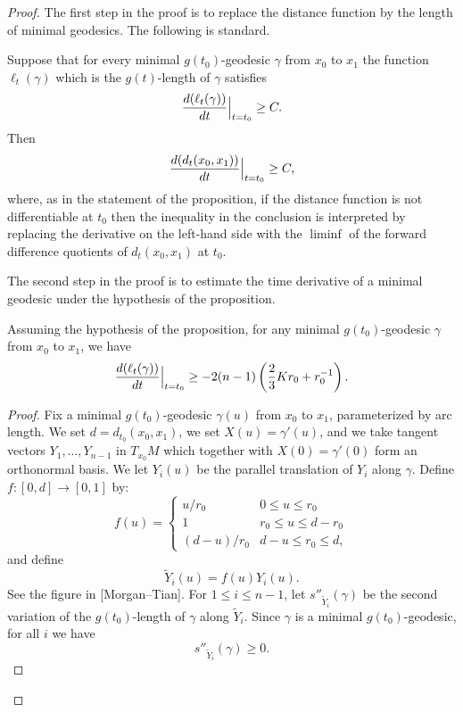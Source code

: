 \begin{proof}
The first step in the proof is to replace the distance function by
the length of minimal geodesics. The following is standard.

\begin{claim}\label{claim:geodesic-length-suffices}
\label{geosuff}
Suppose that for every minimal $g(t_0)$-geodesic $\gamma$ from $x_0$
to $x_1$ the function $\ell_t(\gamma)$ which is the $g(t)$-length of
$\gamma$ satisfies
$$\frac{d(\ell_t(\gamma))}{dt}\Bigl|_{t=t_0}\Bigr.\ge C.$$
Then
$$\frac{d(d_t(x_0,x_1))}{dt}\Bigl|_{t=t_0}\Bigr.\ge C,$$
where, as in the statement of the proposition, if the distance
function is not differentiable at $t_0$ then the inequality in the
conclusion is interpreted by replacing the derivative on the
left-hand side with the $\liminf$ of the forward difference
quotients of $d_t(x_0,x_1)$ at  $t_0$.
\end{claim}



The second step in the proof is to estimate the time derivative of a
minimal geodesic under the hypothesis of the proposition.

\begin{claim}\label{claim:minimal-geodesic-time-derivative}
\label{3.23}
Assuming the hypothesis of the proposition, for any
 minimal $g(t_0)$-geodesic $\gamma$ from $x_0$ to $x_1$, we have
$$\frac{d(\ell_t(\gamma))}{dt}\Bigl|_{t=t_0}\Bigr.\ge -2(n-1)
\left(\frac{2}{3}Kr_0+r_0^{-1}\right).$$
\end{claim}

\begin{proof}
Fix a minimal $g(t_0)$-geodesic $\gamma(u)$ from $x_0$ to $x_1$,
parameterized by arc length. We set $d=d_{t_0}(x_0,x_1)$, we set
$X(u)=\gamma'(u)$, and we take tangent vectors $Y_1,\ldots,Y_{n-1}$
in $T_{x_0}M$ which together with $X(0)=\gamma'(0)$ form an
orthonormal basis. We let $Y_i(u)$ be the parallel translation of
$Y_i$ along $\gamma$. Define $f\colon [0,d]\to [0,1]$ by:
$$f(u)=\begin{cases}u/r_0  & 0\le u\le r_0 \\ 1 & r_0\le u\le d-r_0 \\
(d-u)/r_0 & d-u\le r_0\le d, \end{cases}$$ and define $$\widetilde
Y_i(u)=f(u)Y_i(u).$$ See the figure in [Morgan--Tian].
 For $1\le i\le n-1$, let $s''_{\widetilde
Y_i}(\gamma)$ be the second variation of the $g(t_0)$-length of
$\gamma$ along $\widetilde Y_i$. Since $\gamma$ is a minimal
$g(t_0)$-geodesic, for all $i$ we have
\begin{equation}\label{geoineq}
s''_{\widetilde Y_i}(\gamma)\ge 0.\end{equation}





\end{proof}
\end{proof}
